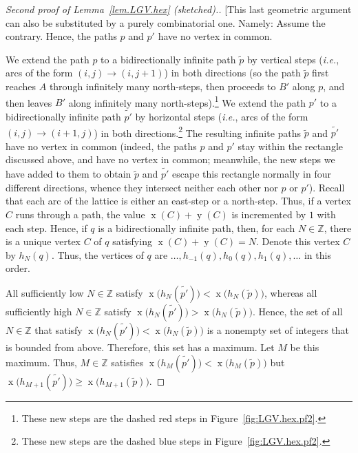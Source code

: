 \documentclass[reqno]{amsart}
\newcommand{\0}{\phantom{c}}
\DeclareMathOperator{\xcoord}{x} %
\DeclareMathOperator{\ycoord}{y} %
\newcommand{\ZZ}{\mathbb{Z}}
\newenvironment{verlonglong}{}{}
\theoremstyle{plain}
\theoremstyle{definition}
\numberwithin{equation}{section}
\begin{document}
\begin{verlonglong}
\begin{proof}[Second proof of Lemma~\ref{lem.LGV.hex} (sketched).]
[This last geometric argument can also be substituted by a purely combinatorial one.
Namely: Assume the contrary. Hence, the paths $p$ and $p'$ have no vertex in common.

We extend the path $p$ to a bidirectionally infinite path $\widetilde{p}$ by vertical steps (\textit{i.e.}, arcs of the form $(i,j) \to (i,j+1)$) in both directions (so the path $\widetilde{p}$ first reaches $A$ through infinitely many north-steps, then proceeds to $B'$ along $p$, and then leaves $B'$ along infinitely many north-steps).\footnote{These new steps are the dashed red steps in Figure~\ref{fig:LGV.hex.pf2}.}
We extend the path $p'$ to a bidirectionally infinite path $\widetilde{p'}$ by horizontal steps (\textit{i.e.}, arcs of the form $(i,j) \to (i+1,j)$) in both directions.\footnote{These new steps are the dashed blue steps in Figure~\ref{fig:LGV.hex.pf2}.}
The resulting infinite paths $\widetilde{p}$ and $\widetilde{p'}$ have no vertex in common (indeed, the paths $p$ and $p'$ stay within the rectangle discussed above, and have no vertex in common; meanwhile, the new
steps we have added to them to obtain $\widetilde{p}$ and $\widetilde{p'}$ escape this rectangle normally in four different directions, whence they intersect neither each other nor $p$ or $p'$).
Recall that each arc of the lattice is either an east-step or a north-step.
Thus, if a vertex $C$ runs through a path, the value $\xcoord(C) + \ycoord(C)$ is incremented by $1$ with each step.
Hence, if $q$ is a bidirectionally infinite path, then, for each $N \in \ZZ$, there is a unique vertex $C$ of $q$ satisfying $\xcoord(C) + \ycoord(C) = N$.
Denote this vertex $C$ by $h_N(q)$.
Thus, the vertices of $q$ are $\ldots, h_{-1}(q), h_{0}(q), h_1(q), \ldots$ in this order.

All sufficiently low $N \in \ZZ$ satisfy $\xcoord\bigl( h_N(\widetilde{p'}) \bigr) < \xcoord\bigl( h_N(\widetilde{p}) \bigr)$, whereas all sufficiently high $N \in \ZZ$ satisfy $\xcoord\bigl( h_N(\widetilde{p'}) \bigr) > \xcoord\bigl( h_N(\widetilde{p}) \bigr)$.
Hence, the set of all $N \in \ZZ$ that satisfy $\xcoord\bigl( h_N(\widetilde{p'}) \bigr) < \xcoord\bigl( h_N(\widetilde{p}) \bigr)$ is a nonempty set of integers that is bounded from above.
Therefore, this set has a maximum.
Let $M$ be this maximum.
Thus, $M \in \ZZ$ satisfies $\xcoord\bigl( h_{M}(\widetilde{p'}) \bigr) < \xcoord\bigl( h_{M}(\widetilde{p}) \bigr)$ but $\xcoord\bigl( h_{M+1}(\widetilde{p'}) \bigr) \geq \xcoord\bigl( h_{M+1}(\widetilde{p}) \bigr)$.


\end{proof}
\end{verlonglong}
\end{document}
